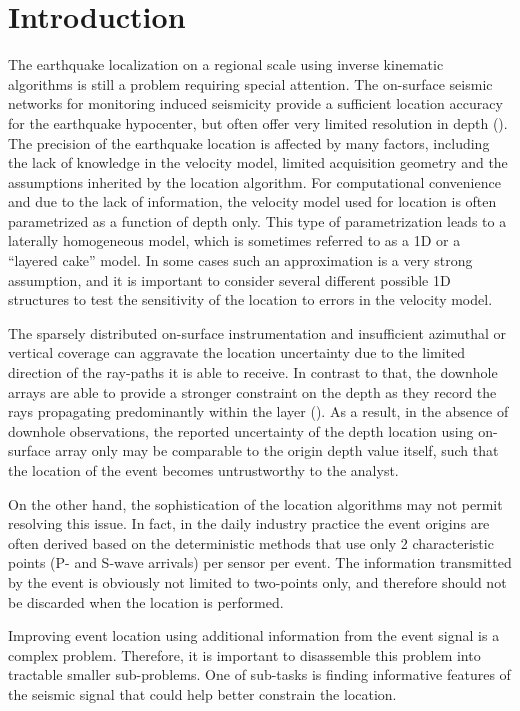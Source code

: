\section{Introduction}
The earthquake localization on a regional scale using inverse kinematic algorithms is still a problem requiring special attention. The on-surface seismic networks for monitoring induced seismicity provide a sufficient location accuracy for the earthquake hypocenter, but often offer very limited resolution in depth (\cite{eisner_uncertainties_2009}). The precision of the earthquake location is affected by many factors, including the lack of knowledge in the velocity model, limited acquisition geometry and the assumptions inherited by the location algorithm. For computational convenience and due to the lack of information, the velocity model used for location is often parametrized as a function of depth only. This type of parametrization leads to a laterally homogeneous model, which is sometimes referred to as a 1D or a ``layered cake'' model. In some cases such an approximation is a very strong assumption, and it is important to consider several different possible 1D structures to test the sensitivity of the location to errors in the velocity model.

The sparsely distributed on-surface instrumentation and insufficient azimuthal or vertical coverage can aggravate the location uncertainty due to the limited direction of the ray-paths it is able to receive. In contrast to that, the downhole arrays are able to provide a stronger constraint on the depth as they record the rays propagating predominantly within the layer (\cite{eisner_comparison_2010}). As a result, in the absence of downhole observations, the reported uncertainty of the depth location using on-surface array only may be comparable to the origin depth value itself, such that the location of the event becomes untrustworthy to the analyst. 

On the other hand, the sophistication of the location algorithms may not permit resolving this issue. In fact, in the daily industry practice the event origins are often derived based on the deterministic methods that use only 2 characteristic points (P- and S-wave arrivals) per sensor per event. The information transmitted by the event is obviously not limited to two-points only, and therefore should not be discarded when the location is performed.

Improving event location using additional information from the event signal is a complex problem. Therefore, it is important to disassemble this problem into tractable smaller sub-problems. One of sub-tasks is finding informative features of the seismic signal that could help better constrain the location. 



